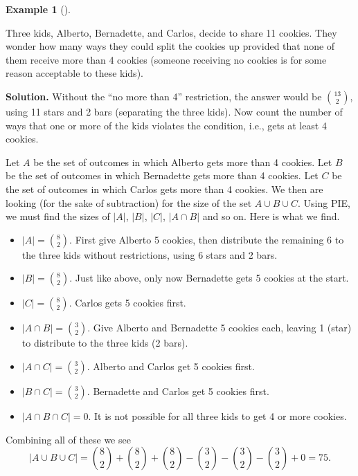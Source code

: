 \documentclass[10pt,]{book}
\theoremstyle{plain}
\theoremstyle{definition}
\newtheorem{example}[theorem]{Example}
\theoremstyle{definition}
\theoremstyle{definition}
\numberwithin{equation}{section}
\begin{document}
\begin{example}[]\label{example-46}

          Three kids, Alberto, Bernadette, and Carlos, decide to share 11 cookies. They wonder how many ways they could split the cookies up provided that none of them receive more than 4 cookies (someone receiving no cookies is for some reason acceptable to these kids).
\par\medskip\noindent%
\textbf{Solution.}\quad 
          Without the ``no more than 4'' restriction, the answer would be \({13 \choose 2}\), using 11 stars and 2 bars (separating the three kids). Now count the number of ways that one or more of the kids violates the condition, i.e., gets at least 4 cookies.
\par

          Let \(A\) be the set of outcomes in which Alberto gets more than 4 cookies. Let \(B\) be the set of outcomes in which Bernadette gets more than 4 cookies. Let \(C\) be the set of outcomes in which Carlos gets more than 4 cookies. We then are looking (for the sake of subtraction) for the size of the set \(A \cup B \cup C\). Using PIE, we must find the sizes of \(|A|\), \(|B|\), \(|C|\), \(|A\cap B|\) and so on. Here is what we find.
\leavevmode%
\begin{itemize}[label=\textbullet]
\item{}\(|A| = {8 \choose 2}\). First give Alberto 5 cookies, then distribute the remaining 6 to the three kids without restrictions, using 6 stars and 2 bars.%
\item{}\(|B| = {8 \choose 2}\). Just like above, only now Bernadette gets 5 cookies at the start.%
\item{}\(|C| = {8 \choose 2}\). Carlos gets 5 cookies first.%
\item{}\(|A \cap B| = {3 \choose 2}\). Give Alberto and Bernadette 5 cookies each, leaving 1 (star) to distribute to the three kids (2 bars).%
\item{}\(|A \cap C| = {3 \choose 2}\). Alberto and Carlos get 5 cookies first.%
\item{}\(|B \cap C| = {3 \choose 2}\). Bernadette and Carlos get 5 cookies first.%
\item{}\(|A \cap B \cap C| = 0\). It is not possible for all three kids to get 4 or more cookies.%
\end{itemize}
\par

          Combining all of these we see
          \begin{equation*}
            |A \cup B \cup C| = {8 \choose 2} + {8 \choose 2} + {8 \choose 2} - {3 \choose 2} - {3 \choose 2} - {3 \choose 2} + 0 = 75.
          \end{equation*}
\par


\end{example}
\end{document}
